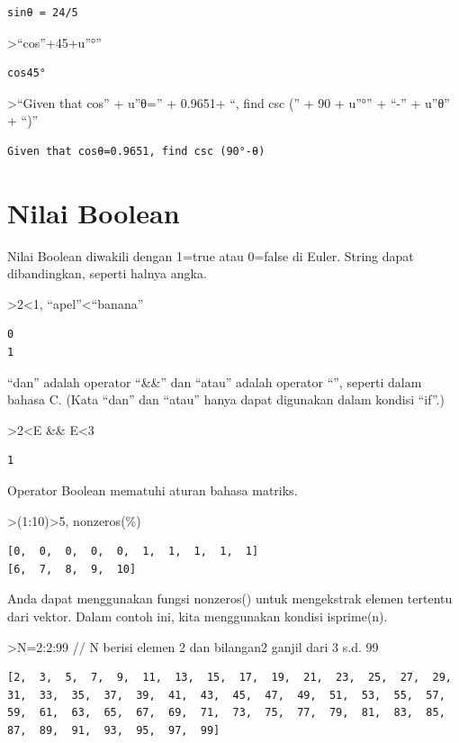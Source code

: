 \documentclass[
]{book}
\begin{document}
\begin{verbatim}
sinθ = 24/5
\end{verbatim}

\textgreater{}``cos''+45+u''°''

\begin{verbatim}
cos45°
\end{verbatim}

\textgreater{}``Given that cos'' + u''θ='' + 0.9651+ ``, find csc ('' + 90 + u''°'' + ``-'' + u''θ'' + ``)''

\begin{verbatim}
Given that cosθ=0.9651, find csc (90°-θ)
\end{verbatim}

\section{Nilai Boolean}\label{nilai-boolean}

Nilai Boolean diwakili dengan 1=true atau 0=false di Euler. String dapat dibandingkan, seperti halnya angka.

\textgreater2\textless1, ``apel''\textless{}``banana''

\begin{verbatim}
0
1
\end{verbatim}

``dan'' adalah operator ``\&\&'' dan ``atau'' adalah operator ``\textbar\textbar{}'', seperti dalam bahasa C. (Kata ``dan'' dan ``atau'' hanya dapat digunakan dalam kondisi ``if''.)

\textgreater2\textless E \&\& E\textless3

\begin{verbatim}
1
\end{verbatim}

Operator Boolean mematuhi aturan bahasa matriks.

\textgreater(1:10)\textgreater5, nonzeros(\%)

\begin{verbatim}
[0,  0,  0,  0,  0,  1,  1,  1,  1,  1]
[6,  7,  8,  9,  10]
\end{verbatim}

Anda dapat menggunakan fungsi nonzeros() untuk mengekstrak elemen tertentu dari vektor. Dalam contoh ini, kita menggunakan kondisi isprime(n).

\textgreater N=2:2:99 // N berisi elemen 2 dan bilangan2 ganjil dari 3 s.d. 99

\begin{verbatim}
[2,  3,  5,  7,  9,  11,  13,  15,  17,  19,  21,  23,  25,  27,  29,
31,  33,  35,  37,  39,  41,  43,  45,  47,  49,  51,  53,  55,  57,
59,  61,  63,  65,  67,  69,  71,  73,  75,  77,  79,  81,  83,  85,
87,  89,  91,  93,  95,  97,  99]
\end{verbatim}
\end{document}
